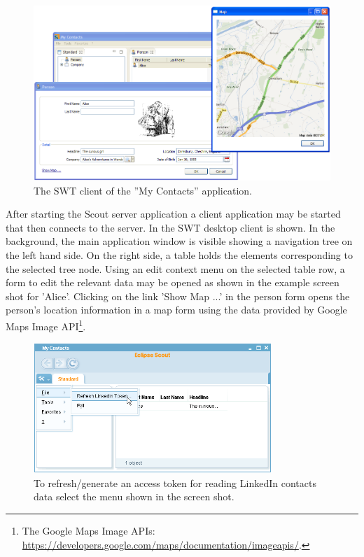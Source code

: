 \documentclass[a4paper,10pt,twoside]{book}
\begin{document}
\begin{figure}
\includegraphics[width=15cm]{my_contacts_swt.png} 
\caption{The SWT client of the ''My Contacts'' application. }
\end{figure}

After starting the Scout server application a client application may be started that then connects to the server. 
In  the SWT desktop client is shown. 
In the background, the main application window is visible showing a navigation tree on the left hand side. 
On the right side, a table holds the elements corresponding to the selected tree node. 
Using an edit context menu on the selected table row, a form to edit the relevant data may be opened as shown in the example screen shot for 'Alice'. 
Clicking on the link 'Show Map ...' in the person form opens the person's location information in a map form using the data provided by Google Maps Image API\footnote{
The Google Maps Image APIs: \url{https://developers.google.com/maps/documentation/imageapis/}.
}.

\begin{figure}
\includegraphics[width=9cm]{my_contacts_rayo_refresh.png} 
\caption{To refresh/generate an access token for reading LinkedIn contacts data select the menu shown in the screen shot. }
\end{figure}
\end{document}
